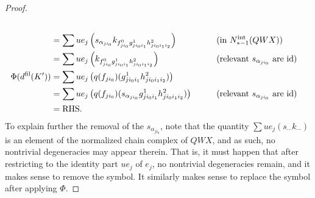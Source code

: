\documentclass[10pt]{article}
\begin{document}
\begin{Grothendieck Multiplicativity}
\begin{proof}
\begin{alignat*}{2}
\\
&=
\sum ue_j\left(s_{\alpha_{ji_0}} k_{f^0_{ji_0}g^1_{ji_0i_1}h^2_{ji_0i_1i_2}}\right)%
&\qquad&\text{(in $N_{*-1}^\textup{int}(QWX)$)}\\
&=
\sum ue_j\left( k_{f^0_{ji_0}g^1_{ji_0i_1}h^2_{ji_0i_1i_2}}\right)%
&\qquad&\text{(relevant $s_{\alpha_{ji_0}}$ are $\textup{id}$)}\\
\Phi(d^\textup{fil}(K'))&=
\sum ue_j\left( q(f_{ji_0})(g^1_{ji_0i_1}h^2_{ji_0i_1i_2})\right)%
\\
&=
\sum ue_j\left( q(f_{ji_0})(s_{\alpha_{ji_0}}g^1_{ji_0i_1}h^2_{ji_0i_1i_2})\right)%
&\qquad&\text{(relevant $s_{\alpha_{ji_0}}$ are $\textup{id}$)}\\
&=\textup{RHS}.
\end{alignat*}
To explain further the removal of the $s_{\alpha_{ji_0}}$, note that the quantity $\sum ue_j(s_{\cdots }k_{\cdots })$ is an element of the normalized chain complex of $QWX$, and as such, no nontrivial degeneracies may appear therein. That is, it must happen that after restricting to the identity part $ue_j$ of $e_j$, no nontrivial degeneracies remain, and it makes sense to remove the symbol. It similarly makes sense to replace the symbol after applying $\Phi$.
\end{proof}
\end{Grothendieck Multiplicativity}
\end{document}
